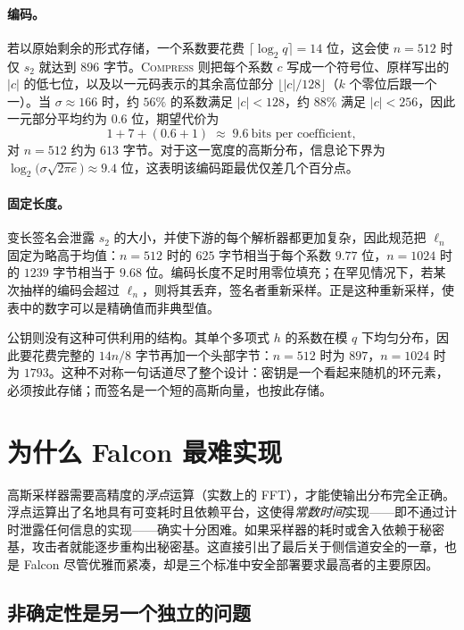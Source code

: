 \paragraph{编码。}若以原始剩余的形式存储，一个系数要花费 $\lceil\log_2 q\rceil = 14$ 位，这会使 $n=512$ 时仅 $s_2$ 就达到 $896$ 字节。\textsc{Compress} 则把每个系数 $c$ 写成一个符号位、原样写出的 $|c|$ 的低七位，以及以一元码表示的其余高位部分 $\lfloor |c|/128\rfloor$（$k$ 个零位后跟一个一）。当 $\sigma\approx166$ 时，约 $56\%$ 的系数满足 $|c|<128$，约 $88\%$ 满足 $|c|<256$，因此一元部分平均约为 $0.6$ 位，期望代价为
\[
1 + 7 + (0.6 + 1) \;\approx\; 9.6\ \text{bits per coefficient},
\]
对 $n=512$ 约为 $613$ 字节。对于这一宽度的高斯分布，信息论下界为 $\log_2\bigl(\sigma\sqrt{2\pi e}\bigr)\approx 9.4$ 位，这表明该编码距最优仅差几个百分点。

\paragraph{固定长度。}变长签名会泄露 $s_2$ 的大小，并使下游的每个解析器都更加复杂，因此规范把 $\ell_n$ 固定为略高于均值：$n=512$ 时的 $625$ 字节相当于每个系数 $9.77$ 位，$n=1024$ 时的 $1239$ 字节相当于 $9.68$ 位。编码长度不足时用零位填充；在罕见情况下，若某次抽样的编码会超过 $\ell_n$，则将其丢弃，签名者重新采样。正是这种重新采样，使表中的数字可以是精确值而非典型值。

公钥则没有这种可供利用的结构。其单个多项式 $h$ 的系数在模 $q$ 下均匀分布，因此要花费完整的 $14n/8$ 字节再加一个头部字节：$n=512$ 时为 $897$，$n=1024$ 时为 $1793$。这种不对称一句话道尽了整个设计：密钥是一个看起来随机的环元素，必须按此存储；而签名是一个短的高斯向量，也按此存储。


\section{为什么 Falcon 最难实现}
\label{sec:falcon-hard}

高斯采样器需要高精度的\emph{浮点}运算（实数上的 FFT），才能使输出分布完全正确。浮点运算出了名地具有可变耗时且依赖平台，这使得\emph{常数时间}实现——即不通过计时泄露任何信息的实现——确实十分困难。如果采样器的耗时或舍入依赖于秘密基，攻击者就能逐步重构出秘密基。这直接引出了最后关于侧信道安全的一章，也是 Falcon 尽管优雅而紧凑，却是三个标准中安全部署要求最高者的主要原因。

\subsection{非确定性是另一个独立的问题}
\label{sec:falcon-determinism}

